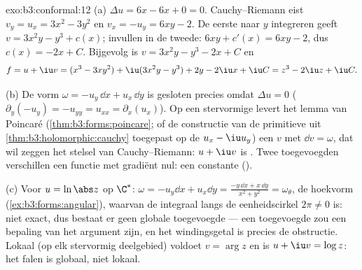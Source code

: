 \begin{solution}{exo:b3:conformal:12}
(a) $\Delta u = 6x - 6x + 0 = 0$. Cauchy--Riemann eist $v_y = u_x
= 3x^2 - 3y^2$ en $v_x = -u_y = 6xy - 2$. De eerste naar $y$
integreren geeft $v = 3x^2y - y^3 + c(x)$; invullen in de tweede:
$6xy + c'(x) = 6xy - 2$, dus $c(x) = -2x + C$. Bijgevolg is $v =
3x^2y - y^3 - 2x + C$ en
\[
f = u + \iu v = (x^3 - 3xy^2) + \iu(3x^2y - y^3)
+ 2y - 2\iu x + \iu C = z^3 - 2\iu z + \iu C .
\]

(b) De vorm $\omega = -u_y\,\dd x + u_x\,\dd y$ is gesloten
precies omdat $\Delta u = 0$ ($\partial_y(-u_y) = -u_{yy} =
u_{xx} = \partial_x(u_x)$). Op een stervormige 
levert het lemma van Poincaré (\cref{thm:b3:forms:poincare}; of
de constructie van de primitieve uit
\cref{thm:b3:holomorphic:cauchy} toegepast op de  $u_x -
\iu u_y$) een $v$ met $\dd v = \omega$, dat wil zeggen het
stelsel van Cauchy--Riemann: $u + \iu v$ is . Twee
toegevoegden verschillen een functie met gradiënt nul: een
constante ().

(c) Voor $u = \ln\abs z$ op $\C^*$: $\omega = -u_y\dd x + u_x\dd
y = \frac{-y\,\dd x + x\,\dd y}{x^2 + y^2} = \omega_\theta$, de
hoekvorm (\cref{ex:b3:forms:angular}), waarvan de integraal langs
de eenheidscirkel $2\pi \neq 0$ is: niet exact, dus bestaat er
geen globale toegevoegde --- een toegevoegde zou een 
bepaling van het argument zijn, en het windingsgetal is precies
de obstructie. Lokaal (op elk stervormig deelgebied) voldoet $v =
\arg z$ en is $u + \iu v = \log z$: het falen is globaal, niet
lokaal.
\end{solution}

